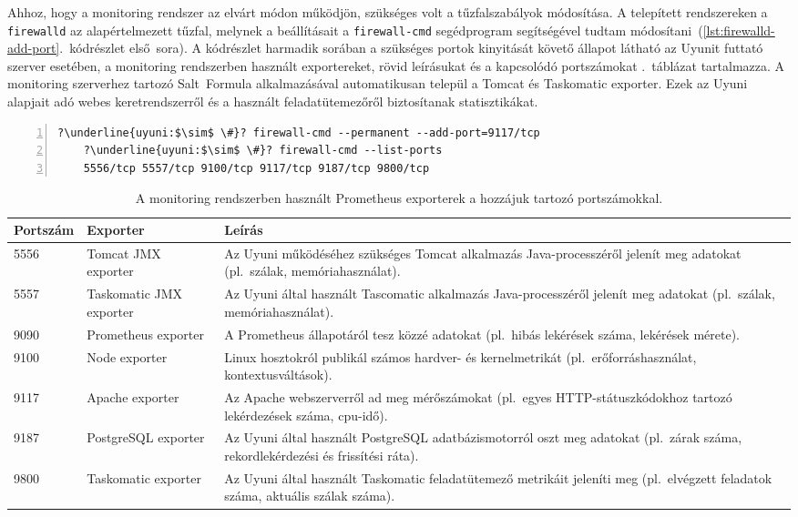 Ahhoz, hogy a monitoring rendszer az elvárt módon működjön, szükséges volt a tűzfalszabályok módosítása. A telepített rendszereken a \texttt{firewalld} az alapértelmezett tűzfal, melynek a beállításait a \texttt{firewall-cmd} segédprogram segítségével tudtam módosítani~(\ref{lst:firewalld-add-port}.~kódrészlet első~sora). A kódrészlet harmadik sorában a szükséges portok kinyitását követő állapot látható az Uyunit futtató szerver esetében, a monitoring rendszerben használt exportereket, rövid leírásukat és a kapcsolódó portszámokat .~táblázat tartalmazza. A monitoring szerverhez tartozó Salt~Formula alkalmazásával automatikusan települ a Tomcat és Taskomatic exporter. Ezek az Uyuni alapjait adó webes keretrendszerről és a használt feladatütemezőről biztosítanak statisztikákat.

\vspace{2mm}
\begin{lstlisting}[caption=Tűzfalszabályok módosítása.,label=lst:firewalld-add-port, numbers=left,escapechar=?]
	?\underline{uyuni:$\sim$ \#}? firewall-cmd --permanent --add-port=9117/tcp
	?\underline{uyuni:$\sim$ \#}? firewall-cmd --list-ports
	5556/tcp 5557/tcp 9100/tcp 9117/tcp 9187/tcp 9800/tcp
\end{lstlisting}

\begin{table}[h]
	\setlength{\tabcolsep}{5pt}
	\renewcommand{\arraystretch}{1.3}
	\centering
	\begin{tabular}{||l l m{7.6cm}||}
		\hline
		Portszám & Exporter & Leírás \\
		\hline\hline
		5556 & Tomcat JMX exporter & Az Uyuni működéséhez szükséges Tomcat alkalmazás Java-processzéről jelenít meg adatokat (pl.~szálak, memóriahasználat). \\
		\hline
		5557 & Taskomatic JMX exporter & Az Uyuni által használt Tascomatic alkalmazás Java-processzéről jelenít meg adatokat (pl.~szálak, memóriahasználat). \\
		\hline
		9090 & Prometheus exporter & A Prometheus állapotáról tesz közzé adatokat (pl.~hibás lekérések száma, lekérések mérete).  \\
		\hline
		9100 & Node exporter & Linux hosztokról publikál számos hardver- és kernelmetrikát (pl.~erőforráshasználat, kontextusváltások). \\
		\hline
		9117 & Apache exporter & Az Apache webszerverről ad meg mérőszámokat (pl.~egyes HTTP-státuszkódokhoz tartozó lekérdezések száma, \acrshort{cpu}-idő).  \\
		\hline
		9187 & PostgreSQL exporter & Az Uyuni által használt PostgreSQL adatbázismotorról oszt meg adatokat (pl.~zárak száma, rekordlekérdezési és frissítési ráta).  \\
		\hline
		9800 & Taskomatic exporter & Az Uyuni által használt Taskomatic feladatütemező metrikáit jeleníti meg (pl.~elvégzett feladatok száma, aktuális szálak száma).  \\
		\hline
	\end{tabular}
	\caption{A monitoring rendszerben használt Prometheus exporterek a hozzájuk tartozó portszámokkal.}
	\label{tab:monitoring-exporters}
\end{table}

